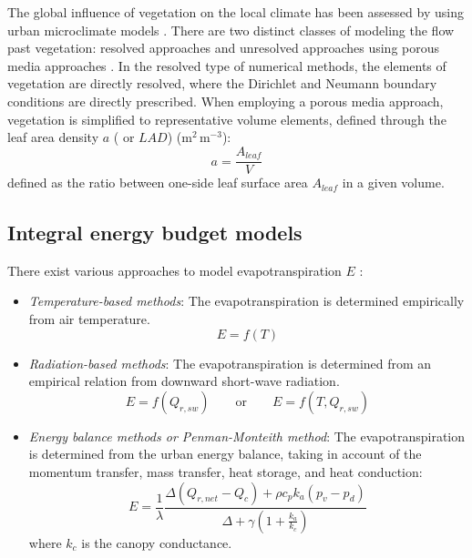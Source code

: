 The global influence of vegetation on the local climate has been assessed by using urban microclimate models \citep{Bruse1998, Robitu2006}. There are two distinct classes of modeling the flow past vegetation: resolved approaches \citep{Endalew2009,Endalew2006} and unresolved approaches using porous media approaches \citep{Sanz2003, Kenjeres2013, Gromke2014, Katul2004}. In the resolved type of numerical methods, the elements of vegetation are directly resolved, where the Dirichlet and Neumann boundary conditions are directly prescribed. When employing a porous media approach, vegetation is simplified to representative volume elements, defined through the leaf area density $a$ ( or $\textit{LAD}$) (m$^2$\,m$^{-3}$):
\begin{equation}
a = \frac{A_{\textit{leaf}}}{V}
\end{equation}
defined as the ratio between one-side leaf surface area $A_{\textit{leaf}}$ in a given volume. 


\subsection{Integral energy budget models}

There exist various approaches to model evapotranspiration $E$ \citep{abtew2012evaporation}: 

\begin{itemize}
	\item \textit{Temperature-based methods}: The evapotranspiration is determined empirically from air temperature.
		\begin{equation}
		E = f(T)
		\end{equation}
	\item \textit{Radiation-based methods}: The evapotranspiration is determined from an empirical relation from downward short-wave radiation.
		\begin{equation}
			E = f(Q_{r,sw}) \qquad \mathrm{or} \qquad E = f(T,Q_{r,sw})
		\end{equation}
	\item \textit{Energy balance methods or Penman-Monteith method}: The evapotranspiration is determined from the urban energy balance, taking in account of the momentum transfer, mass transfer, heat storage, and heat conduction:
		\begin{equation}
			E = \frac{1}{\lambda} \frac{\Delta \left(Q_{r,net}-Q_c\right) + \rho c_p k_a \left(p_v - p_d\right)}{\Delta + \gamma \left(1 + \frac{k_a}{k_c}\right) }
		\end{equation}
	where $k_c$ is the canopy conductance.
\end{itemize}


